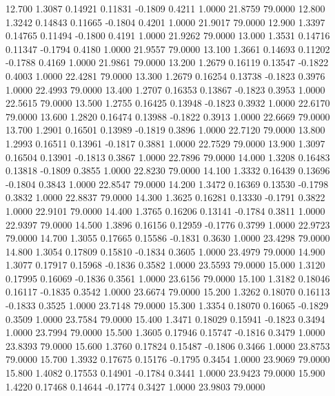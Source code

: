   12.700   1.3087   0.14921   0.11831  -0.1809   0.4211   1.0000  21.8759  79.0000
  12.800   1.3242   0.14843   0.11665  -0.1804   0.4201   1.0000  21.9017  79.0000
  12.900   1.3397   0.14765   0.11494  -0.1800   0.4191   1.0000  21.9262  79.0000
  13.000   1.3531   0.14716   0.11347  -0.1794   0.4180   1.0000  21.9557  79.0000
  13.100   1.3661   0.14693   0.11202  -0.1788   0.4169   1.0000  21.9861  79.0000
  13.200   1.2679   0.16119   0.13547  -0.1822   0.4003   1.0000  22.4281  79.0000
  13.300   1.2679   0.16254   0.13738  -0.1823   0.3976   1.0000  22.4993  79.0000
  13.400   1.2707   0.16353   0.13867  -0.1823   0.3953   1.0000  22.5615  79.0000
  13.500   1.2755   0.16425   0.13948  -0.1823   0.3932   1.0000  22.6170  79.0000
  13.600   1.2820   0.16474   0.13988  -0.1822   0.3913   1.0000  22.6669  79.0000
  13.700   1.2901   0.16501   0.13989  -0.1819   0.3896   1.0000  22.7120  79.0000
  13.800   1.2993   0.16511   0.13961  -0.1817   0.3881   1.0000  22.7529  79.0000
  13.900   1.3097   0.16504   0.13901  -0.1813   0.3867   1.0000  22.7896  79.0000
  14.000   1.3208   0.16483   0.13818  -0.1809   0.3855   1.0000  22.8230  79.0000
  14.100   1.3332   0.16439   0.13696  -0.1804   0.3843   1.0000  22.8547  79.0000
  14.200   1.3472   0.16369   0.13530  -0.1798   0.3832   1.0000  22.8837  79.0000
  14.300   1.3625   0.16281   0.13330  -0.1791   0.3822   1.0000  22.9101  79.0000
  14.400   1.3765   0.16206   0.13141  -0.1784   0.3811   1.0000  22.9397  79.0000
  14.500   1.3896   0.16156   0.12959  -0.1776   0.3799   1.0000  22.9723  79.0000
  14.700   1.3055   0.17665   0.15586  -0.1831   0.3630   1.0000  23.4298  79.0000
  14.800   1.3054   0.17809   0.15810  -0.1834   0.3605   1.0000  23.4979  79.0000
  14.900   1.3077   0.17917   0.15968  -0.1836   0.3582   1.0000  23.5593  79.0000
  15.000   1.3120   0.17995   0.16069  -0.1836   0.3561   1.0000  23.6156  79.0000
  15.100   1.3182   0.18046   0.16117  -0.1835   0.3542   1.0000  23.6674  79.0000
  15.200   1.3262   0.18070   0.16113  -0.1833   0.3525   1.0000  23.7148  79.0000
  15.300   1.3354   0.18070   0.16065  -0.1829   0.3509   1.0000  23.7584  79.0000
  15.400   1.3471   0.18029   0.15941  -0.1823   0.3494   1.0000  23.7994  79.0000
  15.500   1.3605   0.17946   0.15747  -0.1816   0.3479   1.0000  23.8393  79.0000
  15.600   1.3760   0.17824   0.15487  -0.1806   0.3466   1.0000  23.8753  79.0000
  15.700   1.3932   0.17675   0.15176  -0.1795   0.3454   1.0000  23.9069  79.0000
  15.800   1.4082   0.17553   0.14901  -0.1784   0.3441   1.0000  23.9423  79.0000
  15.900   1.4220   0.17468   0.14644  -0.1774   0.3427   1.0000  23.9803  79.0000
